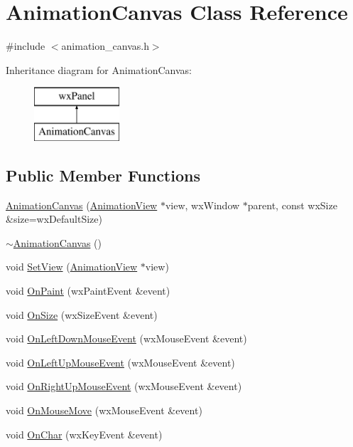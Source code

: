 \hypertarget{a00011}{\section{Animation\-Canvas Class Reference}
\label{a00011}
}


{\ttfamily \#include $<$animation\-\_\-canvas.\-h$>$}

Inheritance diagram for Animation\-Canvas\-:\begin{figure}[H]
\begin{center}
\leavevmode
\includegraphics[height=2.000000cm]{a00011}
\end{center}
\end{figure}
\subsection*{Public Member Functions}
\begin{DoxyCompactItemize}
\item 
\hyperlink{a00011_a27fd0a655037468e01fc0921567508ad}{Animation\-Canvas} (\hyperlink{a00015}{Animation\-View} $\ast$view, wx\-Window $\ast$parent, const wx\-Size \&size=wx\-Default\-Size)
\item 
\hyperlink{a00011_a4623160539fb0844e62d3e3387448c37}{$\sim$\-Animation\-Canvas} ()
\item 
void \hyperlink{a00011_a2a7a367926dd5bb9480cb5d2c7c7051a}{Set\-View} (\hyperlink{a00015}{Animation\-View} $\ast$view)
\item 
void \hyperlink{a00011_ad31258b078d36ca77a25ac327b904763}{On\-Paint} (wx\-Paint\-Event \&event)
\item 
void \hyperlink{a00011_a4389c874d900e409a058edc610cfacab}{On\-Size} (wx\-Size\-Event \&event)
\item 
void \hyperlink{a00011_aac6118fb7d0b16cd22f22e4ff47e6808}{On\-Left\-Down\-Mouse\-Event} (wx\-Mouse\-Event \&event)
\item 
void \hyperlink{a00011_a88d8b515a238f35c1b0cf41d337a83cc}{On\-Left\-Up\-Mouse\-Event} (wx\-Mouse\-Event \&event)
\item 
void \hyperlink{a00011_a789939934f8342c5caab364340e9600e}{On\-Right\-Up\-Mouse\-Event} (wx\-Mouse\-Event \&event)
\item 
void \hyperlink{a00011_a162bd79a30723c1b670fdcbf1d64cc72}{On\-Mouse\-Move} (wx\-Mouse\-Event \&event)
\item 
void \hyperlink{a00011_a09028dec5a9f25f5e3c23df07c4e58c7}{On\-Char} (wx\-Key\-Event \&event)
\end{DoxyCompactItemize}
